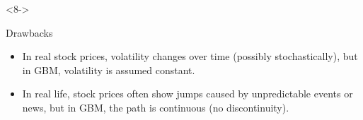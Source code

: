 \documentclass[10pt]{beamer}
\begin{document}
\begin{frame}[t]
\begin{onlyenv}
  \end{onlyenv}
  \begin{onlyenv}<8->
    \begin{block}{Drawbacks}
    \begin{itemize}
      \item<10-> In real stock prices, volatility changes over time (possibly stochastically), but in GBM, volatility is assumed constant.
      \item <11-> In real life, stock prices often show jumps caused by unpredictable events or news, but in GBM, the path is continuous (no discontinuity).
    \end{itemize}
    \end{block}
  \end{onlyenv}
\end{frame}
\end{document}
